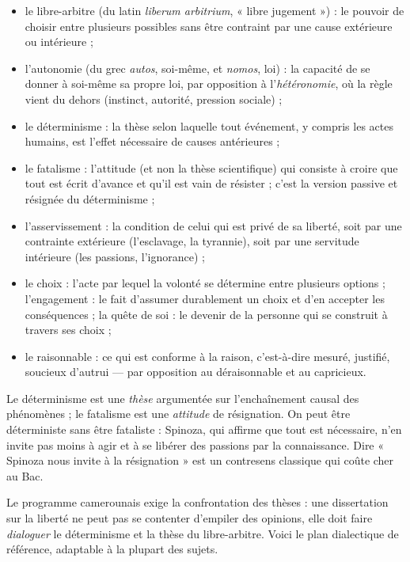 \documentclass[11pt]{article}
\newcommand{\cle}[1]{{\popxbold\color{popdark}#1}}
\newcounter{popsec}
\newcounter{popsub}
\newcommand{\courssub}[1]{%
  \stepcounter{popsub}%
  \par\vspace{9pt}\noindent{\popxbold\fontsize{11.5}{13}\selectfont\color{popink}{\color{poporange}\thepopsec.\thepopsub}\hspace{6pt}#1}\par\nopagebreak\vspace{4pt}
}
\begin{document}
\begin{itemize}
\item le \cle{libre-arbitre} (du latin \emph{liberum arbitrium}, « libre jugement ») : le pouvoir de choisir entre plusieurs possibles sans être contraint par une cause extérieure ou intérieure ;
\item l'\cle{autonomie} (du grec \emph{autos}, soi-même, et \emph{nomos}, loi) : la capacité de se donner à soi-même sa propre loi, par opposition à l'\emph{hétéronomie}, où la règle vient du dehors (instinct, autorité, pression sociale) ;
\item le \cle{déterminisme} : la thèse selon laquelle tout événement, y compris les actes humains, est l'effet nécessaire de causes antérieures ;
\item le \cle{fatalisme} : l'attitude (et non la thèse scientifique) qui consiste à croire que tout est écrit d'avance et qu'il est vain de résister ; c'est la version passive et résignée du déterminisme ;
\item l'\cle{asservissement} : la condition de celui qui est privé de sa liberté, soit par une contrainte extérieure (l'esclavage, la tyrannie), soit par une servitude intérieure (les passions, l'ignorance) ;
\item le \cle{choix} : l'acte par lequel la volonté se détermine entre plusieurs options ; l'\cle{engagement} : le fait d'assumer durablement un choix et d'en accepter les conséquences ; la \cle{quête de soi} : le devenir de la personne qui se construit à travers ses choix ;
\item le \cle{raisonnable} : ce qui est conforme à la raison, c'est-à-dire mesuré, justifié, soucieux d'autrui — par opposition au déraisonnable et au capricieux.
\end{itemize}

\begin{attention}
Le déterminisme est une \emph{thèse} argumentée sur l'enchaînement causal des phénomènes ; le fatalisme est une \emph{attitude} de résignation. On peut être déterministe sans être fataliste : Spinoza, qui affirme que tout est nécessaire, n'en invite pas moins à agir et à se libérer des passions par la connaissance. Dire « Spinoza nous invite à la résignation » est un contresens classique qui coûte cher au Bac.
\end{attention}

\courssub{Le plan dialectique type}

Le programme camerounais exige la confrontation des thèses : une dissertation sur la liberté ne peut pas se contenter d'empiler des opinions, elle doit faire \emph{dialoguer} le déterminisme et la thèse du libre-arbitre. Voici le plan dialectique de référence, adaptable à la plupart des sujets.
\end{document}
